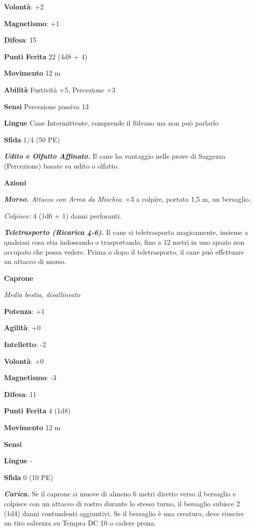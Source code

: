 \begin{multicols}{2}
\textbf{Volontà}: +2

\textbf{Magnetismo}: +1

\textbf{Difesa}: 15

\textbf{Punti Ferita} 22 (4d8 + 4)

\textbf{Movimento} 12 m

\textbf{Abilità} Furtività +5, Percezione +3

\textbf{Sensi} Percezione passiva 13

\textbf{Lingue} Cane Intermittente, comprende il Silvano ma non può
parlarlo

\textbf{Sfida} 1/4 (50 PE)

\emph{\textbf{Udito e Olfatto Affinato.}} Il cane ha vantaggio nelle
prove di Saggezza (Percezione) basate su udito o olfatto.

\textbf{Azioni}

\emph{\textbf{Morso.} Attacco con Arma da Mischia}: +3 a colpire,
portata 1,5 m, un bersaglio.

\emph{Colpisce:} 4 (1d6 + 1) danni perforanti.

\emph{\textbf{Teletrasporto (Ricarica 4-6).}} Il cane si teletrasporta
magicamente, insieme a qualsiasi cosa stia indossando o trasportando,
fino a 12 metri in uno spazio non occupato che possa vedere. Prima o
dopo il teletrasporto, il cane può effettuare un attacco di morso.

\textbf{Caprone}

\emph{Media bestia, disallineato}

\textbf{Potenza}: +1

\textbf{Agilità}: +0

\textbf{Intelletto}: -2

\textbf{Volontà}: +0

\textbf{Magnetismo}: -3

\textbf{Difesa}: 11

\textbf{Punti Ferita} 4 (1d8)

\textbf{Movimento} 12 m

\textbf{Sensi} 

\textbf{Lingue} -

\textbf{Sfida} 0 (10 PE)

\emph{\textbf{Carica.}} Se il caprone si muove di almeno 6 metri diretto
verso il bersaglio e colpisce con un attacco di rostro durante lo stesso
turno, il bersaglio subisce 2 (1d4) danni contundenti aggiuntivi. Se il
bersaglio è una creatura, deve riuscire un tiro salvezza su Tempra DC 10
o cadere prona.


\end{multicols}
